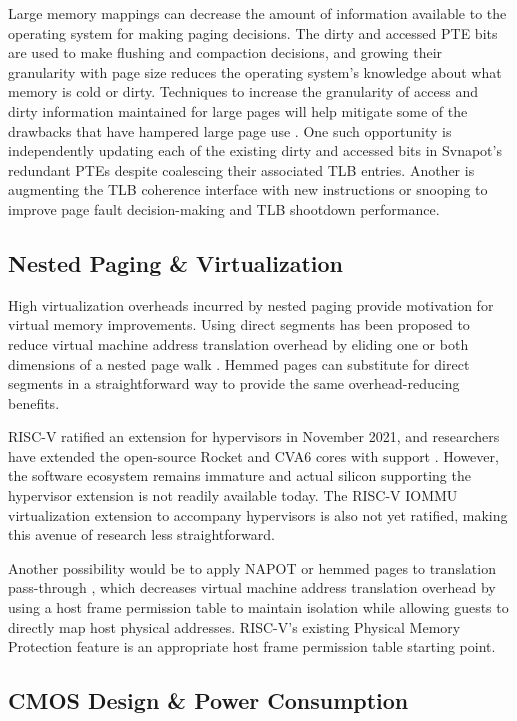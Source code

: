 Large memory mappings can decrease the amount of information available to the operating system for making paging decisions. The dirty and accessed PTE bits are used to make flushing and compaction decisions, and growing their granularity with page size reduces the operating system's knowledge about what memory is cold or dirty. Techniques to increase the granularity of access and dirty information maintained for large pages will help mitigate some of the drawbacks that have hampered large page use \cite{ausavarungnirun_prism_2020}. One such opportunity is independently updating each of the existing dirty and accessed bits in Svnapot's redundant PTEs despite coalescing their associated TLB entries. Another is augmenting the TLB coherence interface with new instructions or snooping to improve page fault decision-making and TLB shootdown performance.

\subsection{Nested Paging \& Virtualization}

High virtualization overheads incurred by nested paging provide motivation for virtual memory improvements. Using direct segments has been proposed to reduce virtual machine address translation overhead by eliding one or both dimensions of a nested page walk \cite{gandhi_efficient_2014, teabe_nocompromis_2021}. Hemmed pages can substitute for direct segments in a straightforward way to provide the same overhead-reducing benefits.

RISC-V ratified an extension for hypervisors in November 2021, and researchers have extended the open-source Rocket and CVA6 cores with support \cite{sa_first_2022, sa_cva6_2023}. However, the software ecosystem remains immature and actual silicon supporting the hypervisor extension is not readily available today. The RISC-V IOMMU virtualization extension to accompany hypervisors is also not yet ratified, making this avenue of research less straightforward.

Another possibility would be to apply NAPOT or hemmed pages to translation pass-through \cite{bergman_translation_2023}, which decreases virtual machine address translation overhead by using a host frame permission table to maintain isolation while allowing guests to directly map host physical addresses. RISC-V's existing Physical Memory Protection feature is an appropriate host frame permission table starting point.

\subsection{CMOS Design \& Power Consumption}

